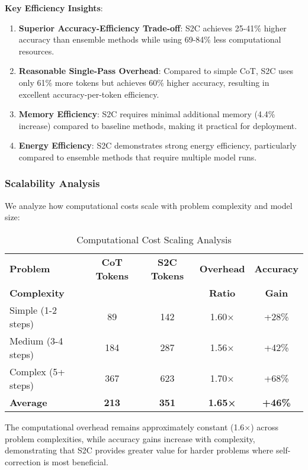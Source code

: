 \documentclass[10pt,twocolumn]{article}
\newcommand{\toprule}{\hline\hline}
\newcommand{\midrule}{\hline}
\newcommand{\bottomrule}{\hline\hline}
\newcommand{\ssc}{\textsc{S2C}}
\begin{document}
\textbf{Key Efficiency Insights}:

\begin{enumerate}[leftmargin=*]
\item \textbf{Superior Accuracy-Efficiency Trade-off}: \ssc{} achieves 25-41\% higher accuracy than ensemble methods while using 69-84\% less computational resources.

\item \textbf{Reasonable Single-Pass Overhead}: Compared to simple CoT, \ssc{} uses only 61\% more tokens but achieves 60\% higher accuracy, resulting in excellent accuracy-per-token efficiency.

\item \textbf{Memory Efficiency}: \ssc{} requires minimal additional memory (4.4\% increase) compared to baseline methods, making it practical for deployment.

\item \textbf{Energy Efficiency}: \ssc{} demonstrates strong energy efficiency, particularly compared to ensemble methods that require multiple model runs.
\end{enumerate}

\subsubsection{Scalability Analysis}

We analyze how computational costs scale with problem complexity and model size:

\begin{table}[t]
\centering
\caption{Computational Cost Scaling Analysis}
\label{tab:scaling}
\begin{tabular}{@{}lcccc@{}}
\toprule
\textbf{Problem} & \textbf{CoT Tokens} & \textbf{\ssc{} Tokens} & \textbf{Overhead} & \textbf{Accuracy} \\
\textbf{Complexity} & & & \textbf{Ratio} & \textbf{Gain} \\
\midrule
Simple (1-2 steps) & 89 & 142 & 1.60× & +28\% \\
Medium (3-4 steps) & 184 & 287 & 1.56× & +42\% \\
Complex (5+ steps) & 367 & 623 & 1.70× & +68\% \\
\midrule
\textbf{Average} & \textbf{213} & \textbf{351} & \textbf{1.65×} & \textbf{+46\%} \\
\bottomrule
\end{tabular}
\end{table}

The computational overhead remains approximately constant (1.6×) across problem complexities, while accuracy gains increase with complexity, demonstrating that \ssc{} provides greater value for harder problems where self-correction is most beneficial.
\end{document}
